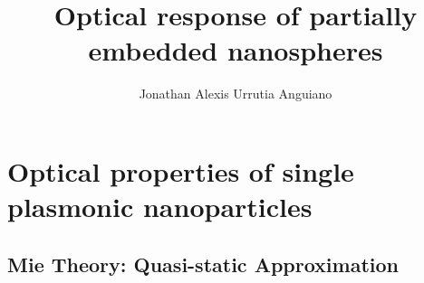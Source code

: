 \documentclass[11pt]{Latex/Classes/PhDthesisPSnPDF}
\author{Jonathan Alexis Urrutia Anguiano}
\title{Optical response of partially embedded nanospheres}
\begin{document}
%
\maketitle									
\frontmatter

%          
%
%                  
       

%
\setcounter{secnumdepth}{3} %
\setcounter{tocdepth}{3}    %

\tableofcontents            %



\mainmatter

\def\baselinestretch{1}                   %

            

\chapter{Optical properties of single plasmonic nanoparticles}
	\section{Mie Theory: Quasi-static Approximation}
\end{document}
